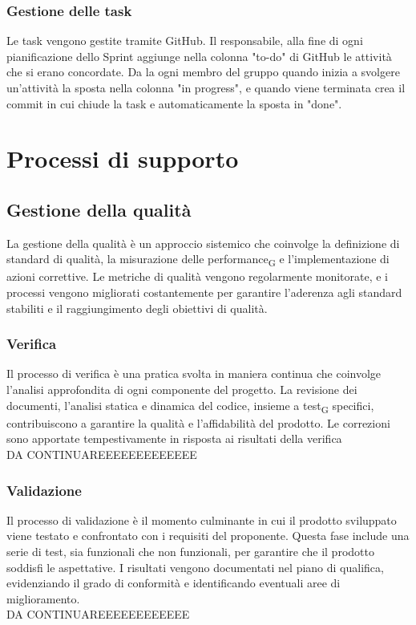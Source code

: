 \documentclass{article}
\begin{document}
\subsubsection{Gestione delle task}
Le task vengono gestite tramite GitHub. Il responsabile, alla fine di ogni pianificazione dello Sprint aggiunge nella colonna "to-do" di GitHub le attività che si erano concordate. Da la ogni membro del gruppo quando inizia a svolgere un'attività la sposta nella colonna "in progress", e quando viene terminata crea il commit in cui chiude la task e automaticamente la sposta in "done".  

\section{Processi di supporto}

\subsection{Gestione della qualità}
La gestione della qualità è un approccio sistemico che coinvolge la definizione di standard di qualità, la misurazione delle performance\textsubscript{G} e l'implementazione di azioni correttive. Le metriche di qualità vengono regolarmente monitorate, e i processi vengono migliorati costantemente per garantire l'aderenza agli standard stabiliti e il raggiungimento degli obiettivi di qualità.

\subsubsection{Verifica}
Il processo di verifica è una pratica svolta in maniera continua che coinvolge l'analisi approfondita di ogni componente del progetto. La revisione dei documenti, l'analisi statica e dinamica del codice, insieme a test\textsubscript{G} specifici, contribuiscono a garantire la qualità e l'affidabilità del prodotto. Le correzioni sono apportate tempestivamente in risposta ai risultati della verifica\\
DA CONTINUAREEEEEEEEEEEEE

\subsubsection{Validazione}
Il processo di validazione è il momento culminante in cui il prodotto sviluppato viene testato e confrontato con i requisiti del proponente. Questa fase include una serie di test, sia funzionali che non funzionali, per garantire che il prodotto soddisfi le aspettative. I risultati vengono documentati nel piano di qualifica, evidenziando il grado di conformità e identificando eventuali aree di miglioramento.\\
DA CONTINUAREEEEEEEEEEEE
\end{document}
